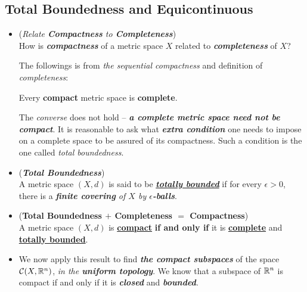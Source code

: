 \documentclass[11pt]{article}
\begin{document}
\subsection{Total Boundedness and Equicontinuous}
\begin{itemize}
\item \begin{remark} (\emph{Relate \textbf{Compactness} to \textbf{Completeness}})\\
How is \emph{\textbf{compactness}} of a metric space $X$ related to \emph{\textbf{completeness}} of $X$? 

The followings is from \emph{the sequential compactness} and definition of \emph{completeness}:
\begin{proposition}
Every \textbf{compact} metric space is \textbf{complete}.
\end{proposition}
The \emph{converse} does not hold -- \emph{\textbf{a complete metric space need not be compact}}. It is reasonable to ask what \emph{\textbf{extra condition}} one needs to impose on a complete space to be assured of its compactness.
Such a condition is the one called \emph{total boundedness}.
\end{remark}

\item \begin{definition} (\emph{\textbf{Total Boundedness}})\\
A metric space $(X, d)$ is said to be \underline{\emph{\textbf{totally bounded}}} if for every $\epsilon > 0$, there is a \emph{\textbf{finite covering} of $X$ by \textbf{$\epsilon$-balls}}.
\end{definition}

\item \begin{theorem} (\textbf{Total Boundedness  $+$ Completeness $=$ Compactness})\citep{munkres2000topology}\\
A metric space $(X, d)$ is \underline{\textbf{compact}} \textbf{if and only if} it is \underline{\textbf{complete}} and \underline{\textbf{totally bounded}}.
\end{theorem}

\item \begin{remark}
We now apply this result to find \emph{\textbf{the compact subspaces}} of the space ${\mathcal C}(X, {\mathbb R}^n)$, \emph{in the \textbf{uniform topology}}. We know that a subspace of ${\mathbb R}^n$ is compact if and only if it is \emph{\textbf{closed}} and \emph{\textbf{bounded}}. 


\end{remark}
\end{itemize}
\end{document}
